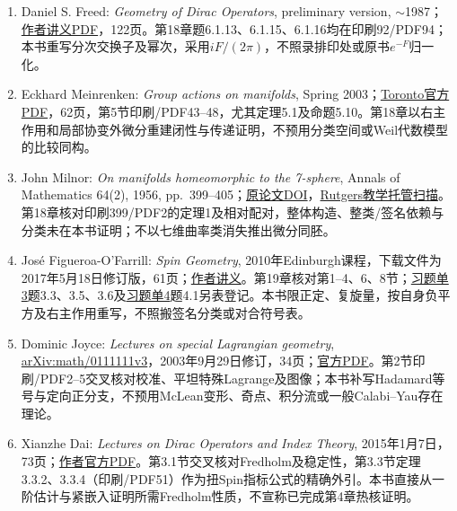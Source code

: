 \begin{enumerate}
\href{https://arxiv.org/abs/2609.33785v1}{arXiv:2609.33785v1}，2026年9月27日提交。第17章记录官方摘要中的构造结论；完整证明未在本书核验。研究动态核查日期为2026年11月2日。
\item Daniel S. Freed: \textit{Geometry of Dirac Operators}, preliminary version, $\sim$1987；\href{https://abel.math.harvard.edu/~dafr/DiracNotes.pdf}{作者讲义PDF}，122页。第18章题6.1.13、6.1.15、6.1.16均在印刷92/PDF94；本书重写分次交换子及幂次，采用$iF/(2\pi)$，不照录排印处或原书$e^{-F}$归一化。
\item Eckhard Meinrenken: \textit{Group actions on manifolds}, Spring 2003；\href{https://www.math.toronto.edu/mein/teaching/LectureNotes/action.pdf}{Toronto官方PDF}，62页，第5节印刷/PDF43--48，尤其定理5.1及命题5.10。第18章以右主作用和局部协变外微分重建闭性与传递证明，不预用分类空间或Weil代数模型的比较同构。
\item John Milnor: \textit{On manifolds homeomorphic to the 7-sphere}, Annals of Mathematics 64(2), 1956, pp.~399--405；\href{https://doi.org/10.2307/1969983}{原论文DOI}，\href{https://sites.math.rutgers.edu/~feehan/teaching/math866/milnor7sphere.pdf}{Rutgers教学托管扫描}。第18章核对印刷399/PDF2的定理1及相对配对，整体构造、整类/签名依赖与分类未在本书证明；不以七维曲率类消失推出微分同胚。
\item Jos\'e Figueroa-O'Farrill: \textit{Spin Geometry}, 2010年Edinburgh课程，下载文件为2017年5月18日修订版，61页；\href{https://webhomes.maths.ed.ac.uk/~jmf/Teaching/Spin/SpinNotes.pdf}{作者讲义}。第19章核对第1--4、6、8节；\href{https://webhomes.maths.ed.ac.uk/~jmf/Teaching/Spin/Tutorial3.pdf}{习题单3}题3.3、3.5、3.6及\href{https://webhomes.maths.ed.ac.uk/~jmf/Teaching/Spin/Tutorial4.pdf}{习题单4}题4.1另表登记。本书限正定、复旋量，按自身负平方及右主作用重写，不照搬签名分类或对合符号表。
\item Dominic Joyce: \textit{Lectures on special Lagrangian geometry}, \href{https://arxiv.org/abs/math/0111111v3}{arXiv:math/0111111v3}，2003年9月29日修订，34页；\href{https://arxiv.org/pdf/math/0111111v3}{官方PDF}。第2节印刷/PDF2--5交叉核对校准、平坦特殊Lagrange及图像；本书补写Hadamard等号与定向正分支，不预用McLean变形、奇点、积分流或一般Calabi--Yau存在理论。
\item Xianzhe Dai: \textit{Lectures on Dirac Operators and Index Theory}, 2015年1月7日，73页；\href{https://web.math.ucsb.edu/~dai/book.pdf}{作者官方PDF}。第3.1节交叉核对Fredholm及稳定性，第3.3节定理3.3.2、3.3.4（印刷/PDF51）作为扭Spin指标公式的精确外引。本书直接从一阶估计与紧嵌入证明所需Fredholm性质，不宣称已完成第4章热核证明。

\end{enumerate}
